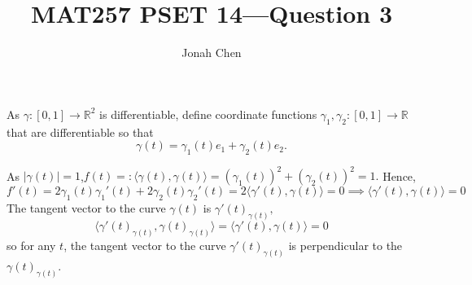 \documentclass{exam}
\title{MAT257 PSET 14---Question 3}
\author{Jonah Chen}
\date{}
\numberwithin{equation}{section}
\newcommand{\R}{\mathbb{R}}
\begin{document}
    \sffamily
    \maketitle
    As \(\gamma:[0,1]\to\R^2\) is differentiable, define coordinate functions \(\gamma_1,\gamma_2:[0,1]\to\R\) that are differentiable so that \[\gamma(t)=\gamma_1(t)e_1+\gamma_2(t)e_2.\] 

    As \(|\gamma(t)|=1\),\(f(t)=:\langle\gamma(t),\gamma(t)\rangle=(\gamma_1(t))^2+(\gamma_2(t))^2=1.\) Hence,\[
        f'(t)=2\gamma_1(t)\gamma_1'(t)+2\gamma_2(t)\gamma_2'(t)=2\langle\gamma'(t),\gamma(t)\rangle=0\implies\langle\gamma'(t),\gamma(t)\rangle=0\]
    The tangent vector to the curve \(\gamma(t)\) is \(\gamma'(t)_{\gamma(t)},\)
    \[\langle\gamma'(t)_{\gamma(t)},\gamma(t)_{\gamma(t)}\rangle=\langle\gamma'(t),\gamma(t)\rangle=0\] 
    so for any \(t\), the tangent vector to the curve \(\gamma'(t)_{\gamma(t)}\) is perpendicular to the \(\gamma(t)_{\gamma(t)}\).
\end{document}
